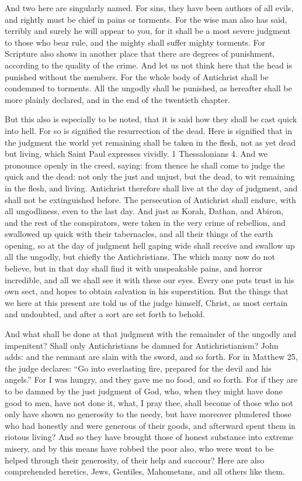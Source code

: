 And two here are singularly named. For sins, they have been authors of all evils, and rightly must be chief in pains or torments. For the wise man also has said, terribly and surely he will appear to you, for it shall be a most severe judgment to those who bear rule, and the mighty shall suffer mighty torments. For Scripture also shows in another place that there are degrees of punishment, according to the quality of the crime. And let us not think here that the head is punished without the members. For the whole body of Antichrist shall be condemned to torments. All the ungodly shall be punished, as hereafter shall be more plainly declared, and in the end of the twentieth chapter.

But this also is especially to be noted, that it is said how they shall be cast quick into hell. For so is signified the resurrection of the dead. Here is signified that in the judgment the world yet remaining shall be taken in the flesh, not as yet dead but living, which Saint Paul expresses vividly. 1 Thessalonians 4. And we pronounce openly in the creed, saying: from thence he shall come to judge the quick and the dead: not only the just and unjust, but the dead, to wit remaining in the flesh, and living. Antichrist therefore shall live at the day of judgment, and shall not be extinguished before. The persecution of Antichrist shall endure, with all ungodliness, even to the last day. And just as Korah, Dathan, and Abiron, and the rest of the conspirators, were taken in the very crime of rebellion, and swallowed up quick with their tabernacles, and all their things of the earth opening, so at the day of judgment hell gaping wide shall receive and swallow up all the ungodly, but chiefly the Antichristians. The which many now do not believe, but in that day shall find it with unspeakable pains, and horror incredible, and all we shall see it with these our eyes. Every one puts trust in his own sect, and hopes to obtain salvation in his superstition. But the things that we here at this present are told us of the judge himself, Christ, as most certain and undoubted, and after a sort are set forth to behold.

And what shall be done at that judgment with the remainder of the ungodly and impenitent? Shall only Antichristians be damned for Antichristianism? John adds: and the remnant are slain with the sword, and so forth. For in Matthew 25, the judge declares: “Go into everlasting fire, prepared for the devil and his angels.” For I was hungry, and they gave me no food, and so forth. For if they are to be damned by the just judgment of God, who, when they might have done good to men, have not done it, what, I pray thee, shall become of those who not only have shown no generosity to the needy, but have moreover plundered those who had honestly and were generous of their goods, and afterward spent them in riotous living? And so they have brought those of honest substance into extreme misery, and by this means have robbed the poor also, who were wont to be helped through their generosity, of their help and succour? Here are also comprehended heretics, Jews, Gentiles, Mahometans, and all others like them.

